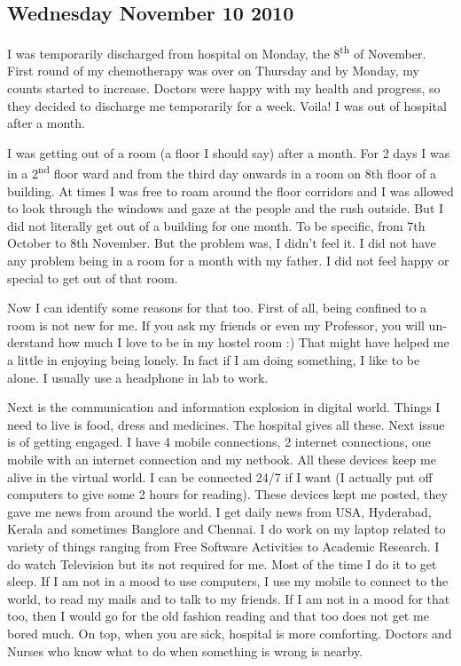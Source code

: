 \vskip 2pt
\begin{english}
\subsection*{Wednesday November 10 2010}

I was temporarily discharged from hospital on Monday, the 8\textsuperscript{th} of November. First round of my chemotherapy 
was over on Thursday and by Monday, my counts started to increase. Doctors were happy with my health and 
progress, so they decided to discharge me temporarily for a week. Voila! I was out of hospital after a month. 

I was getting out of a room (a floor I should say) after a month. For 2 days I was in a 2\textsuperscript{nd} floor ward and from 
the third day onwards in a room on 8th floor of a building. At times I was free to roam around the floor corridors 
and I was allowed to look through the windows and gaze at the people and the rush outside. But I did not literally 
get out of a building for one month. To be specific, from 7th October to 8th November. But the problem was, I didn't 
feel it. I did not have any problem being in a room for a month with my father. I did not feel happy or special to 
get out of that room. 

Now I can identify some reasons for that too. First of all, being confined to a room is not new for me. If you ask 
my friends or even my Professor, you will understand how much I love to be in my hostel room :) That might 
have helped me a little in enjoying being lonely. In fact if I am doing something, I like to be alone. I usually use a 
headphone in lab to work.  

Next is the communication and information explosion in digital world. Things I need to live is food, dress and 
medicines. The hospital gives all these. Next issue is of getting engaged. I have 4 mobile connections, 2 internet 
connections, one mobile with an internet connection and my netbook. All these devices keep me alive in the virtual 
world. I can be connected 24/7 if I want (I actually put off computers to give some 2 hours for reading). These 
devices kept me posted, they gave me news from around the world. I get daily news from USA, Hyderabad, Kerala 
and sometimes Banglore and Chennai. I do work on my laptop related to variety of things ranging from Free Software
Activities to Academic Research. I do watch Television but its not required for me. Most of the time I do it to get 
sleep. If I am not in a mood to use computers, I use my mobile to connect to the world, to read my mails and to talk 
to my friends. If I am not in a mood for that too, then I would go for the old fashion reading and that too does not 
get me bored much. On top, when you are sick, hospital is more comforting. Doctors and Nurses who know what 
to do when something is wrong is nearby.


\end{english}
